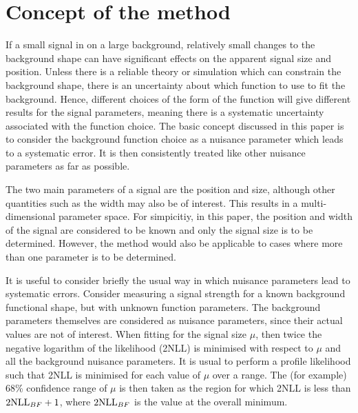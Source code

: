 \section{Concept of the method}
\label{sec:concept}

If a small signal in on
a large background, relatively small changes to the background shape can
have significant effects on the apparent signal size and position.
Unless there is a
reliable theory or simulation which can constrain the background shape,
there is an uncertainty about which function to use to fit
the background. Hence, different choices of the form of the function
will give different results for the signal parameters, meaning there is a
systematic uncertainty associated with the function choice.
The basic concept discussed in this paper is to consider the background
function choice as a nuisance parameter which leads to a systematic error.
It is then consistently treated like other nuisance parameters as far as
possible.

The two main parameters of a signal are the position and size, although other
quantities such as the width may also be of interest. This results in a
multi-dimensional parameter space. For simpicitiy, in this paper, the position
and width of the signal are considered to be known and only the signal
size is to be determined. However, the method would also be applicable to
cases where more than one parameter is to be determined.

It is useful to consider briefly the usual way in which nuisance 
parameters lead to systematic errors. Consider measuring a signal
strength for a known background functional shape, but with unknown function
parameters. The background parameters themselves are considered as
nuisance parameters, since their actual values are not of interest.
When fitting for the signal size $\mu$, then twice the negative logarithm of the
likelihood (2NLL) is minimised with respect to $\mu$ and all the background
nuisance parameters. It is usual to perform a profile likelihood
such that 2NLL is minimised for each value of $\mu$ over a range. 
The (for example) 68\% confidence range of $\mu$ 
is then
taken as the region for which 2NLL is less than ${\rm 2NLL}_{BF}+1$,
where ${\rm 2NLL}_{BF}$ is the value at the overall minimum.

